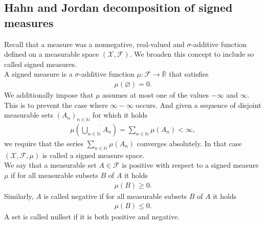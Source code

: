 \documentclass[11pt,a4paper]{article}
\begin{document}
\subsection{Hahn and Jordan decomposition of signed measures}
Recall that a measure was a nonnegative, real-valued and $\sigma$-additive function defined on a measurable space $(\mathcal{X},\mathcal{F})$. We broaden this concept to include so called signed measures.\vspace{1em}\\
A signed measure is a $\sigma$-additive function $\mu:\mathcal{F}\rightarrow\overline{\mathbb{R}}$ that satisfies 
\begin{align*}
\mu(\varnothing)=0.
\end{align*}
We additionally impose that $\mu$ assumes at most one of the values $-\infty$ and $\infty$. This is to prevent the case where $\infty-\infty$ occurs. And given a sequence of disjoint measurable sets $(A_n)_{n\in\mathbb{N}}$ for which it holds
\begin{align*}
\mu\left(\dot{\bigcup\limits_{n\in\mathbb{N}}}A_n\right) = \sum\limits_{n\in\mathbb{N}}\mu(A_n)<\infty,
\end{align*}
we require that the series $\sum\limits_{n\in\mathbb{N}}\mu(A_n)$ converges absolutely. In that case $(\mathcal{X,F},\mu)$ is called a signed measure space.\vspace{2em}\\
We say that a measurable set $A\in\mathcal{F}$ is positive with respect to a signed measure $\mu$ if for all measurable subsets $B$ of $A$ it holds
\begin{align*}
\mu(B)\geq{}0.
\end{align*}
Similarly, $A$ is called negative if for all measurable subsets $B$ of $A$ it holds
\begin{align*}
\mu(B)\leq{}0.
\end{align*}
A set is called nullset if it is both positive and negative.
\end{document}
